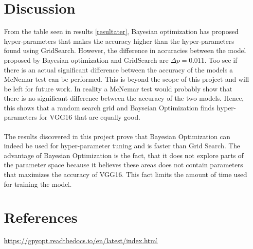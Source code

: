 \documentclass[12pt,fleqn]{article}
\begin{document}
\section{Discussion}

From the table seen in results \ref{resultater}, Bayesian optimization has proposed hyper-parameters that makes the accuracy higher than the hyper-parameters found using GridSearch. However, the difference in accuracies between the model proposed by Bayesian optimization and GridSearch are $ \Delta p = 0.011$. Too see if there is an actual significant difference between the accuracy of the models a McNemar test can be performed. This is beyond the scope of this project and will be left for future work. In reality a McNemar test would probably show that there is no significant difference between the accuracy of the two models. Hence, this shows that a random search grid and Bayseian Optimization finds hyper-parameters for VGG16 that are equally good.
\\\\
The results discovered in this project prove that Bayesian Optimization can indeed be used for hyper-parameter tuning and is faster than Grid Search. The advantage of Bayesian Optimization is the fact, that it does not explore parts of the parameter space because it believes these areas does not contain parameters that maximizes the accuracy of VGG16. This fact limits the amount of time used for training the model. 

\section{References}
\url{https://gpyopt.readthedocs.io/en/latest/index.html}
\end{document}
